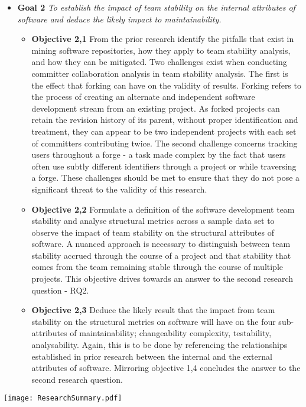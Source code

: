 \begin{itemize}
\begin{itemize}
\end{itemize}
\item  \textbf{Goal 2} \textit{To establish the impact of team stability on the internal attributes of software and deduce the likely impact to maintainability.}
\begin{itemize}
\item \textbf{Objective 2,1} From the prior research identify the pitfalls that exist in mining software repositories, how they apply to team stability analysis, and how they can be mitigated. Two challenges exist when conducting committer collaboration analysis in team stability analysis. The first is the effect that forking can have on the validity of results. Forking refers to the process of creating an alternate and independent software development stream from an existing project. As forked projects can retain the revision history of its parent, without proper identification and treatment, they can appear to be two independent projects with each set of committers contributing twice. The second challenge concerns tracking users throughout a forge - a task made complex by the fact that users often use subtly different identifiers through a project or while traversing a forge. These challenges should be met to ensure that they do not pose a significant threat to the validity of this research.
\item \textbf{Objective 2,2} Formulate a definition of the software development team stability and analyse structural metrics across a sample data set to observe the impact of team stability on the structural attributes of software. A nuanced approach is necessary to distinguish between team stability accrued through the course of a project and that stability that comes from the team remaining stable through the course of multiple projects. This objective drives towards an answer to the second research question - RQ2.
\item \textbf{Objective 2,3} Deduce the likely result that the impact from team stability on the structural metrics on software will have on the four sub-attributes of maintainability; changeability complexity, testability, analysability. Again, this is to be done by referencing the relationships established in prior research between the internal and the external attributes of software. Mirroring objective 1,4 concludes the answer to the second research question.
\end{itemize}
\end{itemize}

\begin{table}
\begin{tabular}
 \centering 
 \texttt{[image: ResearchSummary.pdf]}
 \label{tab:researchSummary}
\end{tabular}
\end{table}

